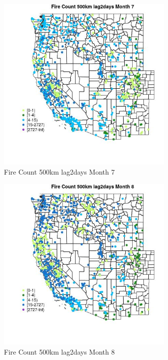 \begin{figure} 
\centering  
\includegraphics[width=0.77\textwidth]{Code_Outputs/Report_ML_input_PM25_Step4_part_f_de_duplicated_aves_prioritize_24hr_obswNAs_MapObsMo7Fire_Count_500km_lag2days.jpg} 
\caption{\label{fig:Report_ML_input_PM25_Step4_part_f_de_duplicated_aves_prioritize_24hr_obswNAsMapObsMo7Fire_Count_500km_lag2days}Fire Count 500km lag2days Month 7} 
\end{figure} 
 

\begin{figure} 
\centering  
\includegraphics[width=0.77\textwidth]{Code_Outputs/Report_ML_input_PM25_Step4_part_f_de_duplicated_aves_prioritize_24hr_obswNAs_MapObsMo8Fire_Count_500km_lag2days.jpg} 
\caption{\label{fig:Report_ML_input_PM25_Step4_part_f_de_duplicated_aves_prioritize_24hr_obswNAsMapObsMo8Fire_Count_500km_lag2days}Fire Count 500km lag2days Month 8} 
\end{figure} 
 

